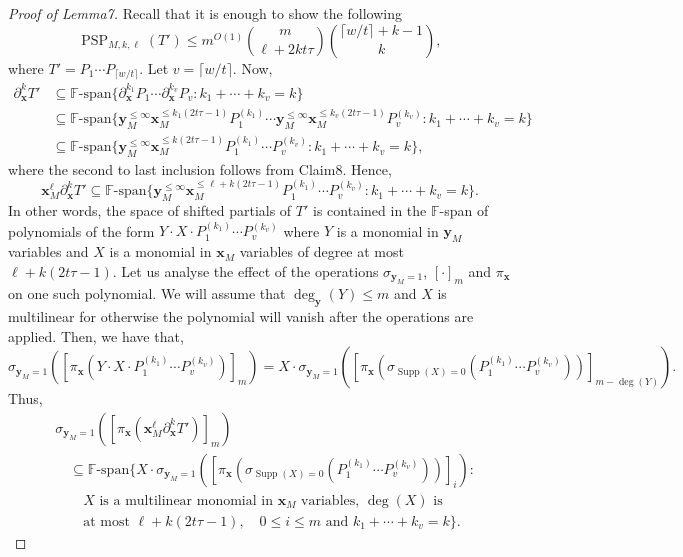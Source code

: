 \documentclass[10pt,a4paper]{article}
\DeclareMathOperator{\PSP}{PSP}
\begin{document}
\begin{proof}[Proof of Lemma7]
Recall that it is enough to show the following
\[
\PSP_{M,k,\ell}(T')\le m^{O(1)}\binom m{\ell+2kt\tau}\binom{\lceil w/t\rceil+k-1}{k},
\]
where $T'=P_1\cdots P_{\lceil w/t\rceil}$. Let $v=\lceil w/t\rceil$. Now,
\begin{align*}
\partial_{\mathbf x}^kT'
&\subseteq\mathbb F\text{-span}\{\partial_{\mathbf x}^{k_1}P_1\cdots\partial_{\mathbf x}^{k_v}P_v:k_1+\cdots+k_v=k\}\\
&\subseteq\mathbb F\text{-span}\{\mathbf y_M^{\le\infty}\mathbf x_M^{\le k_1(2t\tau-1)}P_1^{(k_1)}
\cdots\mathbf y_M^{\le\infty}\mathbf x_M^{\le k_v(2t\tau-1)}P_v^{(k_v)}:k_1+\cdots+k_v=k\}\\
&\subseteq\mathbb F\text{-span}\{\mathbf y_M^{\le\infty}\mathbf x_M^{\le k(2t\tau-1)}P_1^{(k_1)}\cdots P_v^{(k_v)}:k_1+\cdots+k_v=k\},
\end{align*}
where the second to last inclusion follows from Claim8. Hence,
\[
\mathbf x_M^\ell\partial_{\mathbf x}^kT'
\subseteq\mathbb F\text{-span}\{\mathbf y_M^{\le\infty}\mathbf x_M^{\le\ell+k(2t\tau-1)}P_1^{(k_1)}\cdots P_v^{(k_v)}:k_1+\cdots+k_v=k\}.
\]
In other words, the space of shifted partials of $T'$ is contained in the $\mathbb F$-span of polynomials of the form $Y\cdot X\cdot P_1^{(k_1)}\cdots P_v^{(k_v)}$ where $Y$ is a monomial in $\mathbf y_M$ variables and $X$ is a monomial in $\mathbf x_M$ variables of degree at most $\ell+k(2t\tau-1)$. Let us analyse the effect of the operations $\sigma_{\mathbf y_M=1}$, $[\cdot]_m$ and $\pi_{\mathbf x}$ on one such polynomial. We will assume that $\deg_{\mathbf y}(Y)\le m$ and $X$ is multilinear for otherwise the polynomial will vanish after the operations are applied. Then, we have that,
\[
\sigma_{\mathbf y_M=1}([\pi_{\mathbf x}(Y\cdot X\cdot P_1^{(k_1)}\cdots P_v^{(k_v)})]_m)
=X\cdot\sigma_{\mathbf y_M=1}([\pi_{\mathbf x}(\sigma_{\operatorname{Supp}(X)=0}(P_1^{(k_1)}\cdots P_v^{(k_v)}))]_{m-\deg(Y)}).
\]
Thus,
\begin{align*}
&\sigma_{\mathbf y_M=1}([\pi_{\mathbf x}(\mathbf x_M^\ell\partial_{\mathbf x}^kT')]_m)\\
&\quad\subseteq\mathbb F\text{-span}\{X\cdot\sigma_{\mathbf y_M=1}([\pi_{\mathbf x}(\sigma_{\operatorname{Supp}(X)=0}(P_1^{(k_1)}\cdots P_v^{(k_v)}))]_i):\\
&\qquad X\text{ is a multilinear monomial in }\mathbf x_M\text{ variables, }\deg(X)\text{ is}\\
&\qquad\text{at most }\ell+k(2t\tau-1),\quad0\le i\le m\text{ and }k_1+\cdots+k_v=k\}.

\end{align*}
\end{proof}
\end{document}
